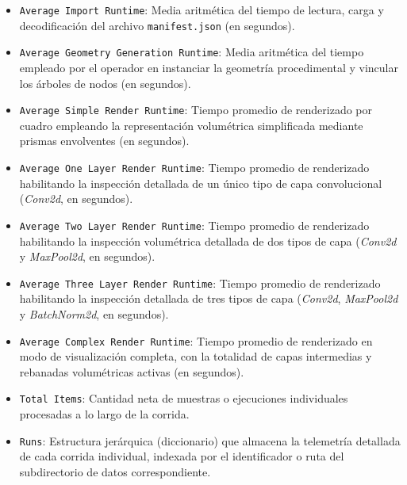 \begin{itemize}
    \item \texttt{Average Import Runtime}: Media aritmética del tiempo de lectura, carga y decodificación del 
    archivo \texttt{manifest.json} (en segundos).
    \item \texttt{Average Geometry Generation Runtime}: Media aritmética del tiempo empleado por el operador en 
    instanciar la geometría procedimental y vincular los árboles de nodos (en segundos).
    \item \texttt{Average Simple Render Runtime}: Tiempo promedio de renderizado por cuadro empleando la representación 
    volumétrica simplificada mediante prismas envolventes (en segundos).
    \item \texttt{Average One Layer Render Runtime}: Tiempo promedio de renderizado habilitando la inspección 
    detallada de un único tipo de capa convolucional (\textit{Conv2d}, en segundos).
    \item \texttt{Average Two Layer Render Runtime}: Tiempo promedio de renderizado habilitando la inspección 
    volumétrica detallada de dos tipos de capa (\textit{Conv2d} y \textit{MaxPool2d}, en segundos).
    \item \texttt{Average Three Layer Render Runtime}: Tiempo promedio de renderizado habilitando la inspección 
    detallada de tres tipos de capa (\textit{Conv2d}, \textit{MaxPool2d} y \textit{BatchNorm2d}, en segundos).
    \item \texttt{Average Complex Render Runtime}: Tiempo promedio de renderizado en modo de visualización completa, 
    con la totalidad de capas intermedias y rebanadas volumétricas activas (en segundos).
    \item \texttt{Total Items}: Cantidad neta de muestras o ejecuciones individuales procesadas a lo largo de la corrida.
    \item \texttt{Runs}: Estructura jerárquica (diccionario) que almacena la telemetría detallada de cada corrida 
    individual, indexada por el identificador o ruta del subdirectorio de datos correspondiente.
\end{itemize}
